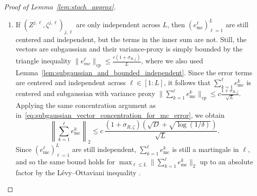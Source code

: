 \documentclass[a4paper,11pt]{article}
\newcommand{\1}{\mathbbm{1}}
\theoremstyle{definition}
\theoremstyle{remark}
\begin{document}
\begin{proof}[Proof of Lemma~\ref{lem:stoch_approx}]
\begin{enumerate}
By concentration of subgaussian vectors, there
exists a constant $c > 0$ (with the required dependencies) such that for all $\delta > 0$ it holds that, with probability at least $1 - \delta$
\begin{equation}\label{eq:subgaussian_vector_concentration_for_mc_error}
    \left\| \sum_{k=1}^{\ell} e^k_{\mathrm{mc}} \right\|_2
  \leq c\, \frac{(1+\sigma_{R{,\zeta}})(\sqrt{D} + \sqrt{\log(1/\delta)})}{\sqrt{ML}}.
\end{equation}
As in \cite{chizat2025hidden}, {since the $(e_{mc}^k)_{k=1}^L$ are independent,} by the Lévy--Ottaviani inequality \cite[Lemma A.3]{chizat2025hidden}, the same bound holds for
$\max_{\ell \leq L} \|\sum_{k=1}^{\ell} e^k_{\mathrm{mc}}\|_2$ up to an absolute factor.
This argument allows to avoid an extra $\sqrt{\log L}$ factor that a union bound over
$\ell \in [1:L]$ would yield; alternatively, one could directly apply Azuma--Hoeffding's
lemma, as in \cite[Lemma A.1]{MeiMontanari2018mftwolayernetworks}).

\item 
    {If $(Z^{j,\ell}, \zeta^{j,\ell})_{j,\ell}$ are only independent across $L$, then $(e^\ell_{\mathrm{mc}})_{\ell=1}^{L}$ are still centered and independent, but the terms in the inner sum are not.}
    {
    Still, the vectors are subgaussian and their variance-proxy is simply bounded by the triangle inequality $\|e^{\ell}_{mc}\|_{vp} \leq \frac{c(1+\sigma_{R,\zeta})}{L}$, where we also used Lemma~\ref{lem:subgaussian_and_bounded_independent}. Since the error terms are centered and independent across $\ell\in[1:L]$, it follows that
    $\sum_{k=1}^{\ell} e^k_{\mathrm{mc}}$ is centered and subgaussian with variance proxy $\|\sum_{k=1}^{\ell} e^k_{\mathrm{mc}} \|_{vp} \leq c\frac{1+\sigma_{R{,\zeta}}}{\sqrt{L}}$. Applying the same concentration argument as in~\eqref{eq:subgaussian_vector_concentration_for_mc_error}, we obtain }
    \begin{equation}\label{eq:subgaussian_vector_concentration_for_mc_error_shared_in_M}
    \left\| \sum_{k=1}^{\ell} e^k_{\mathrm{mc}} \right\|_2
  \leq c\, \frac{(1+\sigma_{R{,\zeta}})(\sqrt{D} + \sqrt{\log(1/\delta)})}{\sqrt{L}}.
\end{equation}
    {Since $(e^\ell_{\mathrm{mc}})_{\ell=1}^{L}$ are still independent, $\sum_{k=1}^{\ell} e^k_{\mathrm{mc}}$ is still a martingale in $\ell$, and so the same bound holds for
$\max_{\ell \leq L} \|\sum_{k=1}^{\ell} e^k_{\mathrm{mc}}\|_2$ up to an absolute factor by the Lévy--Ottaviani inequality .}


\end{enumerate}
\end{proof}
\end{document}

